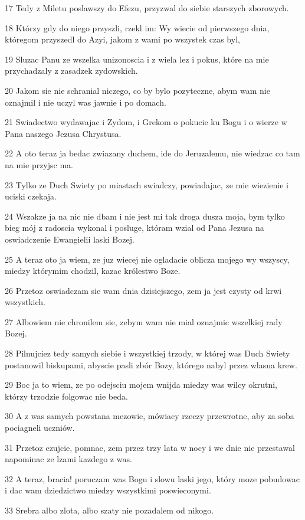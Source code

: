 \par 17 Tedy z Miletu poslawszy do Efezu, przyzwal do siebie starszych zborowych.
\par 18 Którzy gdy do niego przyszli, rzekl im: Wy wiecie od pierwszego dnia, któregom przyszedl do Azyi, jakom z wami po wszystek czas byl,
\par 19 Sluzac Panu ze wszelka unizonoscia i z wiela lez i pokus, które na mie przychadzaly z zasadzek zydowskich.
\par 20 Jakom sie nie schranial niczego, co by bylo pozyteczne, abym wam nie oznajmil i nie uczyl was jawnie i po domach.
\par 21 Swiadectwo wydawajac i Zydom, i Grekom o pokucie ku Bogu i o wierze w Pana naszego Jezusa Chrystusa.
\par 22 A oto teraz ja bedac zwiazany duchem, ide do Jeruzalemu, nie wiedzac co tam na mie przyjsc ma.
\par 23 Tylko ze Duch Swiety po miastach swiadczy, powiadajac, ze mie wiezienie i uciski czekaja.
\par 24 Wszakze ja na nic nie dbam i nie jest mi tak droga dusza moja, bym tylko bieg mój z radoscia wykonal i posluge, któram wzial od Pana Jezusa na oswiadczenie Ewangielii laski Bozej.
\par 25 A teraz oto ja wiem, ze juz wiecej nie ogladacie oblicza mojego wy wszyscy, miedzy którymim chodzil, kazac królestwo Boze.
\par 26 Przetoz oswiadczam sie wam dnia dzisiejszego, zem ja jest czysty od krwi wszystkich.
\par 27 Albowiem nie chronilem sie, zebym wam nie mial oznajmic wszelkiej rady Bozej.
\par 28 Pilnujciez tedy samych siebie i wszystkiej trzody, w której was Duch Swiety postanowil biskupami, abyscie pasli zbór Bozy, którego nabyl przez wlasna krew.
\par 29 Boc ja to wiem, ze po odejsciu mojem wnijda miedzy was wilcy okrutni, którzy trzodzie folgowac nie beda.
\par 30 A z was samych powstana mezowie, mówiacy rzeczy przewrotne, aby za soba pociagneli uczniów.
\par 31 Przetoz czujcie, pomnac, zem przez trzy lata w nocy i we dnie nie przestawal napominac ze lzami kazdego z was.
\par 32 A teraz, bracia! poruczam was Bogu i slowu laski jego, który moze pobudowac i dac wam dziedzictwo miedzy wszystkimi poswieconymi.
\par 33 Srebra albo zlota, albo szaty nie pozadalem od nikogo.
